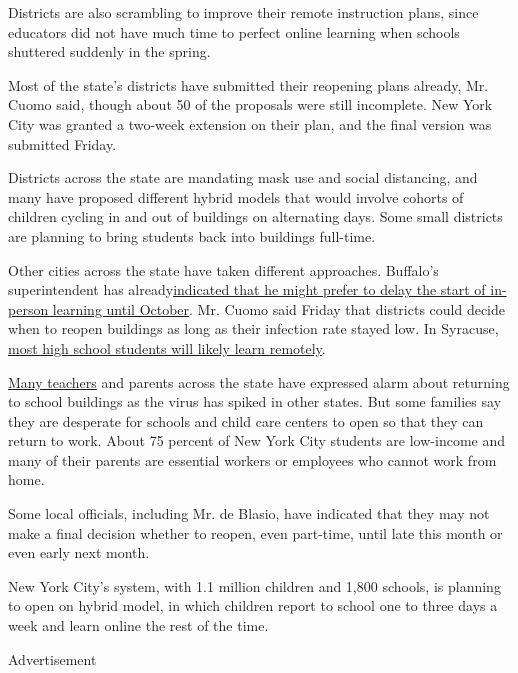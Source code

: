 Districts are also scrambling to improve their remote instruction plans,
since educators did not have much time to perfect online learning when
schools shuttered suddenly in the spring.

Most of the state's districts have submitted their reopening plans
already, Mr. Cuomo said, though about 50 of the proposals were still
incomplete. New York City was granted a two-week extension on their
plan, and the final version was submitted Friday.

Districts across the state are mandating mask use and social distancing,
and many have proposed different hybrid models that would involve
cohorts of children cycling in and out of buildings on alternating days.
Some small districts are planning to bring students back into buildings
full-time.

Other cities across the state have taken different approaches. Buffalo's
superintendent has
already\href{https://www.wgrz.com/article/news/education/state-to-buffalo-schools-180-day-requirement-for-student-instruction-stands/71-75983566-9d86-4b01-8463-621ce0f86d0b}{indicated
that he might prefer to delay the start of in-person learning until
October}. Mr. Cuomo said Friday that districts could decide when to
reopen buildings as long as their infection rate stayed low. In
Syracuse,
\href{https://www.syracuse.com/schools/2020/08/central-ny-school-reopening-plans-are-finally-in-none-are-the-same.html}{most
high school students will likely learn remotely}.

\href{https://www.nytimes3xbfgragh.onion/2020/07/29/us/teacher-union-school-reopening-coronavirus.html}{Many
teachers} and parents across the state have expressed alarm about
returning to school buildings as the virus has spiked in other states.
But some families say they are desperate for schools and child care
centers to open so that they can return to work. About 75 percent of New
York City students are low-income and many of their parents are
essential workers or employees who cannot work from home.

Some local officials, including Mr. de Blasio, have indicated that they
may not make a final decision whether to reopen, even part-time, until
late this month or even early next month.

New York City's system, with 1.1 million children and 1,800 schools, is
planning to open on hybrid model, in which children report to school one
to three days a week and learn online the rest of the time.

Advertisement

